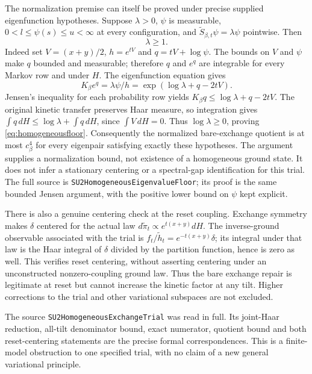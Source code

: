 \documentclass[11pt]{article}
\begin{document}
The normalization premise can itself be proved under precise supplied
eigenfunction hypotheses. Suppose $\lambda>0$, $\psi$ is measurable,
$0<l\leq\psi(s)\leq u<\infty$ at every configuration, and
$\widetilde S_{\beta,t}\psi=\lambda\psi$ pointwise. Then
\begin{equation}\label{eq:homogeneousfloor}
 \lambda\geq1.
\end{equation}
Indeed set $V=(x+y)/2$, $h=e^{tV}$ and $q=tV+\log\psi$.
The bounds on $V$ and $\psi$ make $q$ bounded and measurable;
therefore $q$ and $e^q$ are integrable for every Markov row and
under $H$. The eigenfunction equation gives
\[
 K_\beta e^q=\lambda\psi/h
     =\exp(\log\lambda+q-2tV).
\]
Jensen's inequality for each probability row yields
$K_\beta q\leq\log\lambda+q-2tV$.
The original kinetic transfer preserves Haar measure, so integration
gives $\int q\,dH\leq\log\lambda+\int q\,dH$, since
$\int V\,dH=0$. Thus $\log\lambda\geq0$, proving
\eqref{eq:homogeneousfloor}. Consequently the normalized bare-exchange
quotient is at most $c_\beta^4$ for every eigenpair satisfying exactly
these hypotheses. The argument supplies a normalization bound,
not existence of a homogeneous ground state. It does not infer a
stationary centering or a spectral-gap identification for this trial.
The full source is \texttt{SU2HomogeneousEigenvalueFloor}; its proof
is the same bounded Jensen argument, with the positive lower bound
on $\psi$ kept explicit.

There is also a genuine centering check at the reset coupling.
Exchange symmetry makes $\delta$ centered for the actual law
$d\widetilde\pi_t\propto e^{t(x+y)}dH$. The inverse-ground
observable associated with the trial is
$f_t/\widetilde h_t=e^{-t(x+y)}\delta$; its integral under that
law is the Haar integral of $\delta$ divided by the partition
function, hence is zero as well. This verifies reset centering,
without asserting centering under an unconstructed nonzero-coupling
ground law. Thus the bare exchange repair is legitimate at reset
but cannot increase the kinetic factor at any tilt. Higher
corrections to the trial and other variational subspaces are not
excluded.

\par\noindent
The source \texttt{SU2HomogeneousExchangeTrial} was read in full.
Its joint-Haar reduction, all-tilt denominator bound, exact numerator,
quotient bound and both reset-centering statements are the precise
formal correspondences. This is a finite-model obstruction to one
specified trial, with no claim of a new general variational principle.
\end{document}
